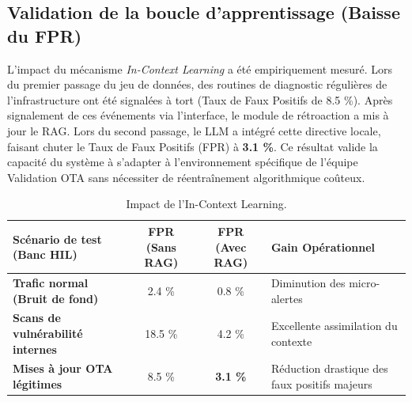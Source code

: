 \documentclass[a4paper, 12pt]{report}
\begin{document}
\subsection{Validation de la boucle d'apprentissage (Baisse du FPR)}
L'impact du mécanisme \textit{In-Context Learning} a été empiriquement mesuré. Lors du premier passage du jeu de données, des routines de diagnostic régulières de l'infrastructure ont été signalées à tort (Taux de Faux Positifs de 8.5 \%). 
Après signalement de ces événements via l'interface, le module de rétroaction a mis à jour le RAG. Lors du second passage, le LLM a intégré cette directive locale, faisant chuter le Taux de Faux Positifs (FPR) à \textbf{3.1 \%}. Ce résultat valide la capacité du système à s'adapter à l'environnement spécifique de l'équipe Validation OTA sans nécessiter de réentraînement algorithmique coûteux.

\begin{table}[htbp]
\centering
\caption[Impact de l'In-Context Learning]{Impact de l'In-Context Learning.}
\label{tab:resultats_rag}
\vspace{0.2cm}
\begin{tabular}{|>{\raggedright\arraybackslash}p{4.5cm}|c|c|>{\raggedright\arraybackslash}p{4.5cm}|}
\hline
\textbf{Scénario de test (Banc HIL)} & \textbf{FPR (Sans RAG)} & \textbf{FPR (Avec RAG)} & \textbf{Gain Opérationnel} \\ \hline
\textbf{Trafic normal (Bruit de fond)} & 2.4 \% & 0.8 \% & Diminution des micro-alertes \\ \hline
\textbf{Scans de vulnérabilité internes} & 18.5 \% & 4.2 \% & Excellente assimilation du contexte \\ \hline
\textbf{Mises à jour OTA légitimes} & 8.5 \% & \textbf{3.1 \%} & Réduction drastique des faux positifs majeurs \\ \hline
\end{tabular}
\end{table}
\end{document}
